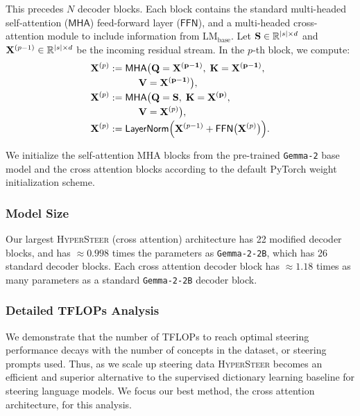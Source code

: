 \documentclass[11pt]{article}
\newcommand{\methodname}{\textsc{HyperSteer}}
\newcommand{\gemma}{\texttt{Gemma-2-2B}}
\begin{document}
This precedes $N$ decoder blocks. Each block contains the standard multi-headed self-attention ($\mathsf{MHA}$) feed-forward layer ($\mathsf{FFN}$), and a multi-headed cross-attention module to include information from $\mathrm{LM}_\mathrm{base}$. 
 Let ${\bf S}\in \mathbb R^{|s|\times d}$ and ${\bf X}^{(p-1)}\in \mathbb R^{|s|\times d}$ be the incoming residual stream.
In the \(p\)‐th block, we compute:
\[
\begin{aligned}
  {\bf X}^{(p)}
    &:= \mathsf{MHA}\bigl(
         \mathbf Q = \bf X^{(p-1)},\;
         \mathbf K = \bf X^{(p-1)},\\[-2pt]
    &\qquad\quad
         \mathbf V = \bf X^{(p-1)}
       \bigr),\\[-2pt]
  {\bf X}^{(p)}
    &:= \mathsf{MHA}\bigl(
         \mathbf Q = \bf S,\;
         \mathbf K = {\bf X}^{(p)},\\[-2pt]
    &\qquad\quad
         \mathbf V = {\bf X}^{(p)}
       \bigr),\\[-2pt]
  {\bf X}^{(p)}
    &:= \mathsf{LayerNorm}\Bigl(
         {\bf X}^{(p-1)} + \mathsf{FFN}\bigl({\bf X}^{(p)}\bigr)
       \Bigr).
\end{aligned}
\]

We initialize the self-attention MHA blocks from the pre-trained \texttt{Gemma-2} base model and the cross attention blocks according to the default PyTorch weight initialization scheme.

\subsubsection{Model Size}

\label{appendix:param-efficiency}

Our largest \methodname\; (cross attention) architecture has 22 modified decoder blocks, and has $\approx 0.998$ times the parameters as \gemma, which has 26 standard decoder blocks. Each cross attention decoder block has $\approx 1.18$ times as many parameters as a standard \gemma\; decoder block.

\subsubsection{Detailed TFLOPs Analysis}
\label{appendix:flops}

We demonstrate that the number of TFLOPs to reach optimal steering performance decays with the number of concepts in the dataset, or steering prompts used. Thus, as we scale up steering data \methodname\; becomes an efficient and superior alternative to the supervised dictionary learning baseline for steering language models. We focus our best method, the cross attention architecture, for this analysis.
\end{document}
